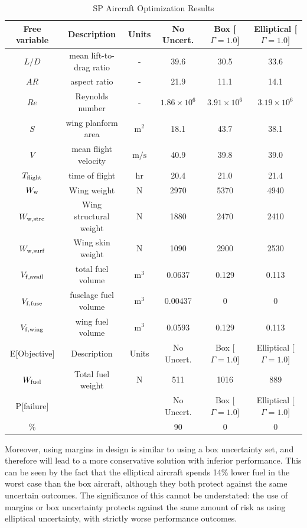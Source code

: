 \begin{table}[!h]
\begin{center}
\caption{\label{tab:results} SP Aircraft Optimization Results}
\begin{tabular}{c c c c c c}
\hline
Free variable & Description & Units & No Uncert. & Box [$\Gamma = 1.0$] & Elliptical [$\Gamma = 1.0$] \\
\hline
$L/D$ & mean lift-to-drag ratio & - & 39.6 & 30.5 & 33.6 \\
$AR$ & aspect ratio & - & 21.9 & 11.1 & 14.1 \\
$Re$ & Reynolds number & - & $1.86 \times 10^6$ & $3.91\times 10^6$ & $3.19 \times 10^6$ \\
$S$ & wing planform area &$\mathrm{m^2}$ & 18.1 & 43.7 & 38.1 \\
$V$ & mean flight velocity &$\mathrm{m/s}$ & 40.9 & 39.8 & 39.0 \\
$T_{\rm{flight}}$ & time of flight & $\mathrm{hr}$ & 20.4 & 21.0 & 21.4 \\
$W_{\rm{w}}$ & Wing weight & $\mathrm{N}$ & 2970 & 5370 & 4940 \\
$W_{\rm{w,strc}}$ & Wing structural weight &$\mathrm{N}$ & 1880 & 2470 & 2410 \\
$W_{\rm{w,surf}}$ & Wing skin weight &$\mathrm{N}$ & 1090 & 2900 & 2530 \\
$V_{\rm{f,avail}}$ & total fuel volume & $\mathrm{m^3}$ & 0.0637 & 0.129 & 0.113 \\
$V_{\rm{f,fuse}}$ & fuselage fuel volume & $\mathrm{m^3}$ & 0.00437 & 0 & 0 \\
$V_{\rm{f,wing}}$ & wing fuel volume &$\mathrm{m^3}$ & 0.0593 & 0.129 & 0.113 \\
\hline
E[Objective] & Description & Units & No Uncert. & Box [$\Gamma = 1.0$] & Elliptical [$\Gamma = 1.0$] \\
\hline
$W_{\rm{fuel}}$ & Total fuel weight & $\mathrm{N}$ & 511 & 1016 & 889 \\
\hline
P[failure] & & & No Uncert. & Box [$\Gamma = 1.0$] & Elliptical [$\Gamma = 1.0$] \\
\hline
\% & & & 90 & 0 & 0\\
\hline
\end{tabular}
\end{center}
\end{table}

Moreover, using margins in design is similar to using a box uncertainty set, and therefore will lead
to a more conservative solution with inferior performance. This can be seen by the fact that
the elliptical aircraft spends 14\% lower fuel in the worst case
than the box aircraft, although they both protect against the same uncertain outcomes.
The significance of this cannot be understated: the use of margins or box uncertainty protects
against the same amount of risk as using elliptical uncertainty, with strictly worse performance outcomes.

